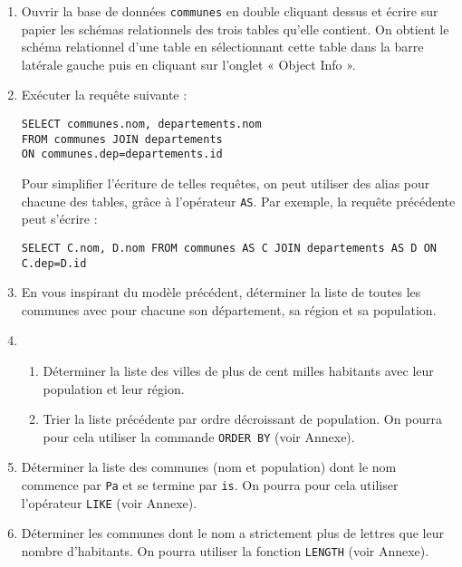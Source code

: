 \begin{enumerate}
 \item Ouvrir la base de données \verb|communes| en double cliquant dessus et écrire sur papier les schémas relationnels des trois tables qu'elle contient. On obtient le schéma relationnel d'une table en sélectionnant cette table dans la barre latérale gauche puis en cliquant sur l'onglet « Object Info ».
 
 \item Exécuter la requête suivante :
 
 \verb|SELECT communes.nom, departements.nom|\\
 \verb|FROM communes JOIN departements|\\
 \verb|ON communes.dep=departements.id|

 Pour simplifier l'écriture de telles requêtes, on peut utiliser des alias pour chacune des tables, grâce à l'opérateur \verb|AS|. Par exemple, la requête précédente peut s'écrire :
 
 \verb|SELECT C.nom, D.nom FROM communes AS C JOIN departements AS D ON C.dep=D.id|
 
 \item En vous inspirant du modèle précédent, déterminer la liste de toutes les communes avec pour chacune son département, sa région et sa population.
 
 \item  \begin{enumerate}
\item Déterminer la liste des villes de plus de cent milles habitants avec leur population et leur région.                                                                                                    
\item Trier la liste précédente par ordre décroissant de population. On pourra pour cela utiliser la commande \verb|ORDER BY| (voir Annexe).
\end{enumerate}

\item Déterminer la liste des communes (nom et population) dont le nom commence par \verb|Pa| et se termine par \verb|is|. On pourra pour cela utiliser l'opérateur \verb|LIKE| (voir Annexe).

\item Déterminer les communes dont le nom a strictement plus de lettres que leur nombre d'habitants. On pourra utiliser la fonction \verb|LENGTH| (voir Annexe).
\end{enumerate}


